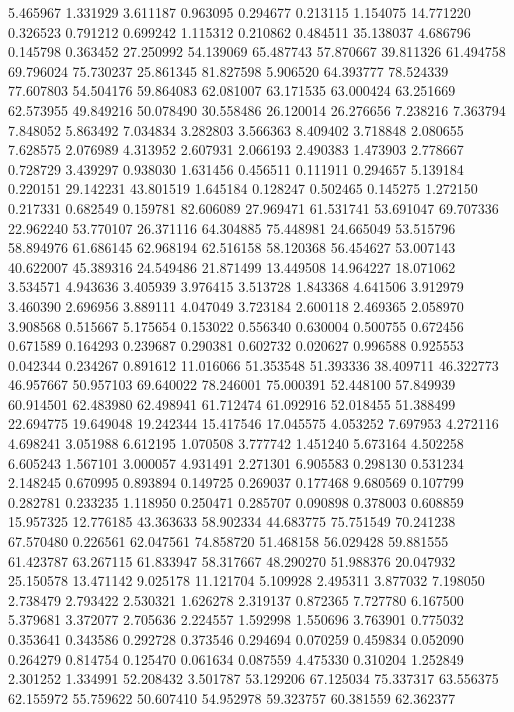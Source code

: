 5.465967
1.331929
3.611187
0.963095
0.294677
0.213115
1.154075
14.771220
0.326523
0.791212
0.699242
1.115312
0.210862
0.484511
35.138037
4.686796
0.145798
0.363452
27.250992
54.139069
65.487743
57.870667
39.811326
61.494758
69.796024
75.730237
25.861345
81.827598
5.906520
64.393777
78.524339
77.607803
54.504176
59.864083
62.081007
63.171535
63.000424
63.251669
62.573955
49.849216
50.078490
30.558486
26.120014
26.276656
7.238216
7.363794
7.848052
5.863492
7.034834
3.282803
3.566363
8.409402
3.718848
2.080655
7.628575
2.076989
4.313952
2.607931
2.066193
2.490383
1.473903
2.778667
0.728729
3.439297
0.938030
1.631456
0.456511
0.111911
0.294657
5.139184
0.220151
29.142231
43.801519
1.645184
0.128247
0.502465
0.145275
1.272150
0.217331
0.682549
0.159781
82.606089
27.969471
61.531741
53.691047
69.707336
22.962240
53.770107
26.371116
64.304885
75.448981
24.665049
53.515796
58.894976
61.686145
62.968194
62.516158
58.120368
56.454627
53.007143
40.622007
45.389316
24.549486
21.871499
13.449508
14.964227
18.071062
3.534571
4.943636
3.405939
3.976415
3.513728
1.843368
4.641506
3.912979
3.460390
2.696956
3.889111
4.047049
3.723184
2.600118
2.469365
2.058970
3.908568
0.515667
5.175654
0.153022
0.556340
0.630004
0.500755
0.672456
0.671589
0.164293
0.239687
0.290381
0.602732
0.020627
0.996588
0.925553
0.042344
0.234267
0.891612
11.016066
51.353548
51.393336
38.409711
46.322773
46.957667
50.957103
69.640022
78.246001
75.000391
52.448100
57.849939
60.914501
62.483980
62.498941
61.712474
61.092916
52.018455
51.388499
22.694775
19.649048
19.242344
15.417546
17.045575
4.053252
7.697953
4.272116
4.698241
3.051988
6.612195
1.070508
3.777742
1.451240
5.673164
4.502258
6.605243
1.567101
3.000057
4.931491
2.271301
6.905583
0.298130
0.531234
2.148245
0.670995
0.893894
0.149725
0.269037
0.177468
9.680569
0.107799
0.282781
0.233235
1.118950
0.250471
0.285707
0.090898
0.378003
0.608859
15.957325
12.776185
43.363633
58.902334
44.683775
75.751549
70.241238
67.570480
0.226561
62.047561
74.858720
51.468158
56.029428
59.881555
61.423787
63.267115
61.833947
58.317667
48.290270
51.988376
20.047932
25.150578
13.471142
9.025178
11.121704
5.109928
2.495311
3.877032
7.198050
2.738479
2.793422
2.530321
1.626278
2.319137
0.872365
7.727780
6.167500
5.379681
3.372077
2.705636
2.224557
1.592998
1.550696
3.763901
0.775032
0.353641
0.343586
0.292728
0.373546
0.294694
0.070259
0.459834
0.052090
0.264279
0.814754
0.125470
0.061634
0.087559
4.475330
0.310204
1.252849
2.301252
1.334991
52.208432
3.501787
53.129206
67.125034
75.337317
63.556375
62.155972
55.759622
50.607410
54.952978
59.323757
60.381559
62.362377

